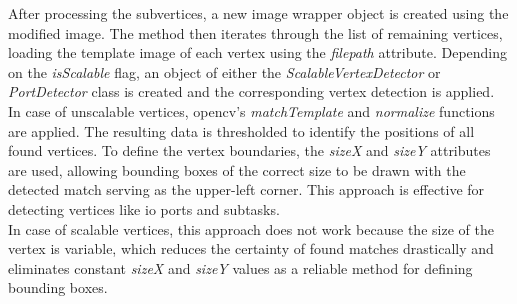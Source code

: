 After processing the subvertices, a new image wrapper object is created using the modified image. The method then iterates through the list of remaining vertices, loading the template image of each vertex using the \textit{filepath} attribute. Depending on the \textit{isScalable} flag, an object of either the \textit{ScalableVertexDetector} or \textit{PortDetector} class is created and the corresponding vertex detection is applied.\\
In case of unscalable vertices, \acrshort{opencv}'s \textit{matchTemplate} and \textit{normalize} functions are applied. The resulting data is thresholded to identify the positions of all found vertices. To define the vertex boundaries, the \textit{sizeX} and \textit{sizeY} attributes are used, allowing bounding boxes of the correct size to be drawn with the detected match serving as the upper-left corner. This approach is effective for detecting vertices like \acrshort{io} ports and subtasks.\\
In case of scalable vertices, this approach does not work because the size of the vertex is variable, which reduces the certainty of found matches drastically and eliminates constant \textit{sizeX} and \textit{sizeY} values as a reliable method for defining bounding boxes.\\

